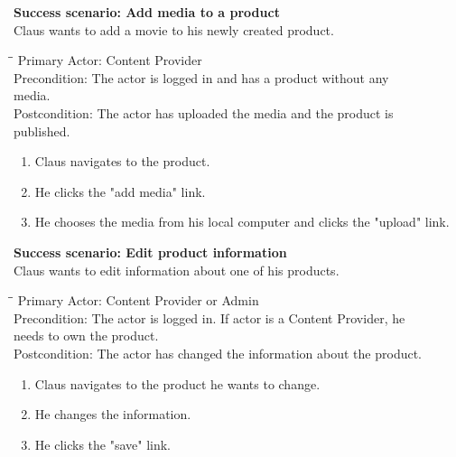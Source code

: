 \vspace{3mm}
\textbf{Success scenario: Add media to a product} \\
Claus wants to add a movie to his newly created product.
\begin{tabbing}
\hspace{5mm}\=\hspace{26mm}\=\kill
\>Primary Actor:\> Content Provider\\
\>Precondition:\> The actor is logged in and has a product without any\\ \hspace{85px} media.\\
\>Postcondition:\> The actor has uploaded the media and the product is\\ \hspace{85px} published.
\end{tabbing}
\begin{enumerate} \setlength{\itemsep}{-1mm}
	\item Claus navigates to the product.
	\item He clicks the "add media" link.
	\item He chooses the media from his local  computer and clicks the "upload" link.
\end{enumerate}
\vspace{3mm}
\textbf{Success scenario: Edit product information} \\
Claus wants to edit information about one of his products.
\begin{tabbing}
\hspace{5mm}\=\hspace{26mm}\=\kill
\>Primary Actor:\> Content Provider or Admin\\
\>Precondition:\> The actor is logged in. If actor is a Content Provider, he\\ \hspace{85px} needs to own the product.\\
\>Postcondition:\> The actor has changed the information about the product.
\end{tabbing}
\begin{enumerate} \setlength{\itemsep}{-1mm}
	\item Claus navigates to the product he wants to change.
	\item He changes the information.
	\item He clicks the "save" link.
\end{enumerate}
\vspace{3mm}
